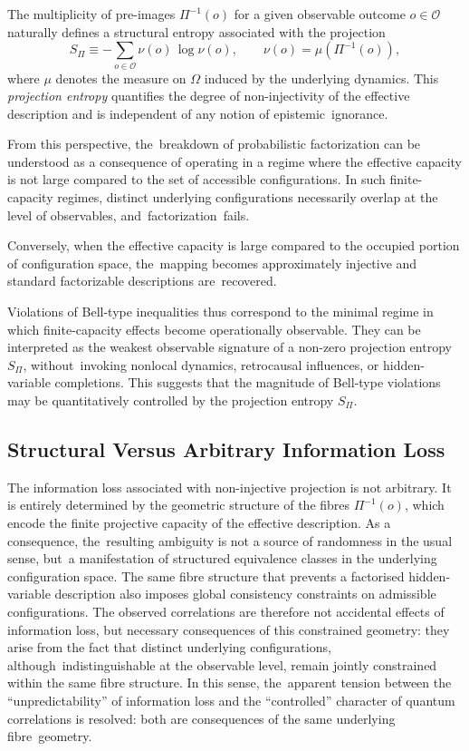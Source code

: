 \documentclass[quantumrep,article,accept,pdftex,oneauthor]{Definitions/mdpi}
\theoremstyle{remark}
\begin{document}
  The multiplicity of pre-images $\Pi^{-1}(o)$ for a given observable outcome
  $o \in \mathcal{O}$ naturally defines a structural entropy associated with the
  projection
  \[
    S_{\Pi} \equiv -\sum_{o \in \mathcal{O}} \nu(o)\,\log \nu(o),
    \qquad
    \nu(o)=\mu\!\left(\Pi^{-1}(o)\right),
  \]
  where $\mu$ denotes the measure on $\Omega$ induced by the underlying dynamics.
  This \emph{projection entropy} quantifies the degree of non-injectivity of the
  effective description and is independent of any notion of epistemic~ignorance.

  From this perspective, the~breakdown of probabilistic factorization can be understood
  as a consequence of operating in a regime where the effective capacity is not large
  compared to the set of accessible configurations.
  In such finite-capacity regimes, distinct underlying configurations necessarily
  overlap at the level of observables, and~factorization~fails.

  Conversely, when the effective capacity is large compared to the occupied portion
  of configuration space, the~mapping becomes approximately injective and standard
  factorizable descriptions are~recovered.

  Violations of Bell-type inequalities thus correspond to the minimal regime in which
  finite-capacity effects become operationally observable.
  They can be interpreted as the weakest observable signature of a non-zero projection
  entropy $S_{\Pi}$, without~invoking nonlocal dynamics, retrocausal influences, or hidden-variable completions.
  This suggests that the magnitude of Bell-type violations may be quantitatively
  controlled by the projection entropy $S_{\Pi}$.

 \subsection{Structural Versus Arbitrary Information Loss}
    The information loss associated with non-injective projection is not arbitrary.
    It is entirely determined by the geometric structure of the fibres
    $\Pi^{-1}(o)$, which encode the finite projective capacity of the effective
    description.
    As a consequence, the~resulting ambiguity is not a source of randomness in the
    usual sense, but~a manifestation of structured equivalence classes in the underlying
    configuration space.
    The same fibre structure that prevents a factorised hidden-variable description also
    imposes global consistency constraints on admissible configurations.
    The observed correlations are therefore not accidental effects of information loss,
    but necessary consequences of this constrained geometry: they arise from the fact
    that distinct underlying configurations, although~indistinguishable at the observable
    level, remain jointly constrained within the same fibre structure.
    In this sense, the~apparent tension between the ``unpredictability'' of information
    loss and the ``controlled'' character of quantum correlations is resolved: both
    are consequences of the same underlying fibre~geometry.
\end{document}
